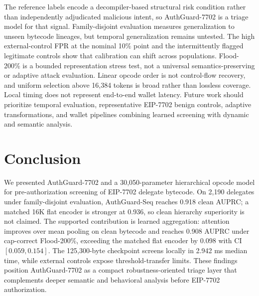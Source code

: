 \documentclass[conference]{IEEEtran}
\begin{document}
The reference labels encode a decompiler-based structural risk condition rather than independently adjudicated malicious intent, so AuthGuard-7702 is a triage model for that signal. Family-disjoint evaluation measures generalization to unseen bytecode lineages, but temporal generalization remains untested. The high external-control FPR at the nominal 10\% point and the intermittently flagged legitimate controls show that calibration can shift across populations. Flood-200\% is a bounded representation stress test, not a universal semantics-preserving or adaptive attack evaluation. Linear opcode order is not control-flow recovery, and uniform selection above 16,384 tokens is broad rather than lossless coverage. Local timing does not represent end-to-end wallet latency. Future work should prioritize temporal evaluation, representative EIP-7702 benign controls, adaptive transformations, and wallet pipelines combining learned screening with dynamic and semantic analysis.

\section{Conclusion}
\label{sec:conclusion}

We presented AuthGuard-7702 and a 30,050-parameter hierarchical opcode model for pre-authorization screening of EIP-7702 delegate bytecode. On 2,190 delegates under family-disjoint evaluation, AuthGuard-Seq reaches 0.918 clean AUPRC; a matched 16K flat encoder is stronger at 0.936, so clean hierarchy superiority is not claimed. The supported contribution is learned aggregation: attention improves over mean pooling on clean bytecode and reaches 0.908 AUPRC under cap-correct Flood-200\%, exceeding the matched flat encoder by 0.098 with CI $[0.059,0.154]$. The 125,300-byte checkpoint screens locally in 2.942 ms median time, while external controls expose threshold-transfer limits. These findings position AuthGuard-7702 as a compact robustness-oriented triage layer that complements deeper semantic and behavioral analysis before EIP-7702 authorization.
\end{document}
